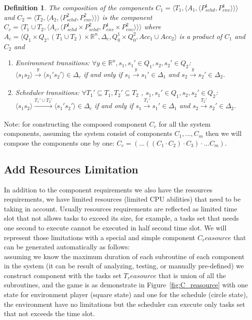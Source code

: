 \documentclass[ twoside, 12pt ]{article}
\newcommand\R{{\mathbb R}}
\newtheorem{dfn}{Definition} %
\begin{document}
\begin{dfn}
    The composition of the components $C_1=\langle T_1, \langle A_1, \langle P_{schd}^1, P_{env}^1\rangle\rangle\rangle$ and $C_2=\langle T_2, \langle A_2, \langle P_{schd}^2, P_{env}^2\rangle\rangle\rangle$ is the component $C_c = \langle T_1 \cup T_2, \langle A_c, \langle P_{schd}^1 \times P_{schd}^2, P_{env}^1 \times P_{env}^2 \rangle\rangle\rangle$ where $A_c= \langle Q_1 \times Q_2,(T_1 \cup T_2) \times \R^n,\Delta_c,Q_0^1 \times Q_0^2,Acc_1 \cup Acc_2 \rangle$ is a product of $C_1$ and $C_2$ and 
    \begin{enumerate}
        \item Environment transitions: $\forall y \in \R^n, s_1 , s_1' \in Q_1, s_2 , s_2' \in Q_2$:
        $\langle s_{1} s_2 \rangle \xrightarrow[]{y} \langle s_{1}' s_2' \rangle \in \Delta_c$
        if and only if 
        $s_{1} \xrightarrow[]{y} s_{1}' \in \Delta_1$ and $s_{2} \xrightarrow[]{y} s_{2}' \in \Delta_2$.
        \item Scheduler transitions: $\forall T_1' \subseteq T_1,T_2' \subseteq T_2$ , $s_1 , s_1' \in Q_1, s_2 , s_2' \in Q_2$:
        $\langle s_{1} s_2 \rangle \xrightarrow[]{T_1' \cup T_2'} \langle s_{1}' s_2' \rangle \in \Delta_c$
        if and only if         
        $s_{1} \xrightarrow[]{T_1'} s_{1}' \in \Delta_1$ and $s_{2} \xrightarrow[]{T_2'} s_{2}' \in \Delta_2$.
    \end{enumerate}
\end{dfn}

Note: for constructing the composed component $C_c$ for all the system components, assuming the system consist of components $C_1 , ... , C_m$ then we will compose the components one by one: $C_c = (...((C_1 \cdot C_2) \cdot C_3 ) \cdot ... C_m)$.

\subsection{Add Resources Limitation}
In addition to the component requirements we also have the resources requirements, we have limited resources (limited CPU abilities) that need to be taking in account.
Usually resources requirements are reflected as limited time slot that not allows tasks to exceed its size, for example, a tasks set that needs one second to execute cannot be executed in half second time slot.
We will represent those limitations with a special and simple component $C_reasource$ that can be generated automatically as follows:\\
assuming we know the maximum duration of each subroutine of each component in the system (it can be result of analyzing, testing, or manually pre-defined) we construct component with the tasks set $T_reasource$ that is union of all the subroutines, and the game is as demonstrate in Figure~\ref{fig:C_reasource} with one state for environment player (square state) and one for the schedule (circle state), the environment have no limitations but the scheduler can execute only tasks set that not exceeds the time slot.
\end{document}
